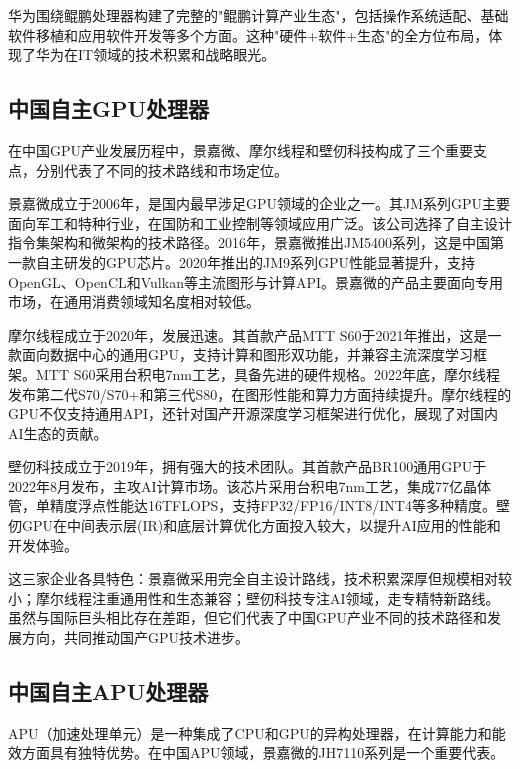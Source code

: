 \documentclass[a4paper,colorlinks=true,linkcolor=blue,urlcolor=blue,citecolor=green,bookmarks=true]{article}
\begin{document}
华为围绕鲲鹏处理器构建了完整的"鲲鹏计算产业生态"，包括操作系统适配、基础软件移植和应用软件开发等多个方面。这种"硬件+软件+生态"的全方位布局，体现了华为在IT领域的技术积累和战略眼光\cite{9}\cite{10}\cite{11}\cite{12}\cite{13}。

\subsection{中国自主GPU处理器}

在中国GPU产业发展历程中，景嘉微、摩尔线程和壁仞科技构成了三个重要支点，分别代表了不同的技术路线和市场定位。

景嘉微成立于2006年，是国内最早涉足GPU领域的企业之一。其JM系列GPU主要面向军工和特种行业，在国防和工业控制等领域应用广泛。该公司选择了自主设计指令集架构和微架构的技术路径。2016年，景嘉微推出JM5400系列，这是中国第一款自主研发的GPU芯片。2020年推出的JM9系列GPU性能显著提升，支持OpenGL、OpenCL和Vulkan等主流图形与计算API。景嘉微的产品主要面向专用市场，在通用消费领域知名度相对较低\cite{9}\cite{10}\cite{11}\cite{12}\cite{13}。

摩尔线程成立于2020年，发展迅速。其首款产品MTT S60于2021年推出，这是一款面向数据中心的通用GPU，支持计算和图形双功能，并兼容主流深度学习框架。MTT S60采用台积电7nm工艺，具备先进的硬件规格。2022年底，摩尔线程发布第二代S70/S70+和第三代S80，在图形性能和算力方面持续提升。摩尔线程的GPU不仅支持通用API，还针对国产开源深度学习框架进行优化，展现了对国内AI生态的贡献\cite{9}\cite{10}\cite{11}\cite{12}\cite{13}。

壁仞科技成立于2019年，拥有强大的技术团队。其首款产品BR100通用GPU于2022年8月发布，主攻AI计算市场。该芯片采用台积电7nm工艺，集成77亿晶体管，单精度浮点性能达16TFLOPS，支持FP32/FP16/INT8/INT4等多种精度。壁仞GPU在中间表示层(IR)和底层计算优化方面投入较大，以提升AI应用的性能和开发体验\cite{9}\cite{10}\cite{11}\cite{12}\cite{13}。

这三家企业各具特色：景嘉微采用完全自主设计路线，技术积累深厚但规模相对较小；摩尔线程注重通用性和生态兼容；壁仞科技专注AI领域，走专精特新路线。虽然与国际巨头相比存在差距，但它们代表了中国GPU产业不同的技术路径和发展方向，共同推动国产GPU技术进步\cite{9}\cite{10}\cite{11}\cite{12}\cite{13}。

\subsection{中国自主APU处理器}

APU（加速处理单元）是一种集成了CPU和GPU的异构处理器，在计算能力和能效方面具有独特优势。在中国APU领域，景嘉微的JH7110系列是一个重要代表。
\end{document}
